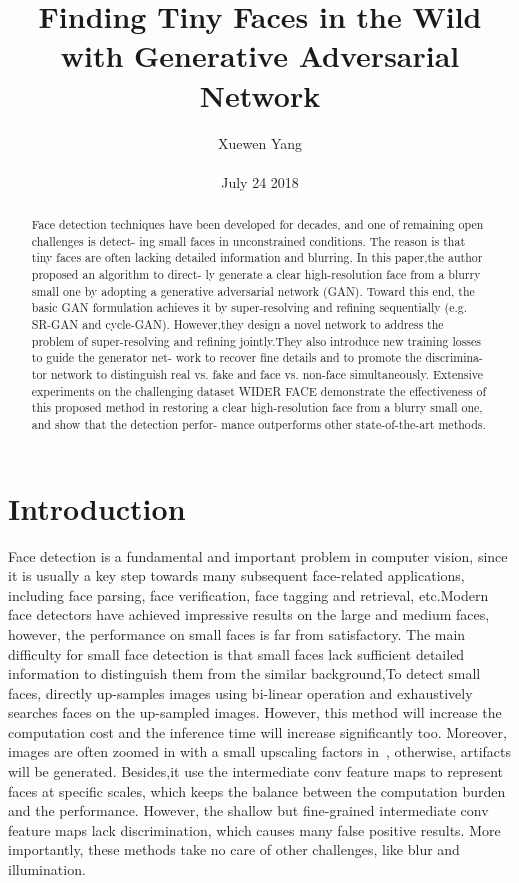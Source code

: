 \documentclass[10pt,twocolumn,letterpaper]{article}
\author{Xuewen Yang\\\\
July 24 2018}
\title{Finding Tiny Faces in the Wild with Generative Adversarial Network}
\begin{document}
\maketitle
\begin{abstract}
Face detection techniques have been developed for
decades, and one of remaining open challenges is detect-
ing small faces in unconstrained conditions. The reason is
that tiny faces are often lacking detailed information and
blurring. In this paper,the author proposed an algorithm to direct-
ly generate a clear high-resolution face from a blurry small
one by adopting a generative adversarial network (GAN).
Toward this end, the basic GAN formulation achieves it by
super-resolving and refining sequentially (e.g. SR-GAN and
cycle-GAN). However,they design a novel network to address
the problem of super-resolving and refining jointly.They also
introduce new training losses to guide the generator net-
work to recover fine details and to promote the discrimina-
tor network to distinguish real vs. fake and face vs. non-face
simultaneously. Extensive experiments on the challenging
dataset WIDER FACE demonstrate the effectiveness of this
proposed method in restoring a clear high-resolution face
from a blurry small one, and show that the detection perfor-
mance outperforms other state-of-the-art methods.
\end{abstract}
\section{Introduction}
Face detection is a fundamental and important problem
in computer vision, since it is usually a key step towards
many subsequent face-related applications, including
face parsing, face verification, face tagging and retrieval,
etc.Modern face detectors have achieved impressive results
on the large and medium faces, however, the performance
on small faces is far from satisfactory. The main difficulty
for small face detection is that small
faces lack sufficient detailed information to distinguish
them from the similar background,To detect small faces, \cite{Xu2017Learning} directly
up-samples images using bi-linear operation and exhaustively
searches faces on the up-sampled images. However,
this method will increase the computation cost and the
inference time will increase significantly too. Moreover,
images are often zoomed in with a small upscaling factors in~\cite{Xu2017Learning}, otherwise, artifacts will be generated.
Besides,it use the intermediate conv feature
maps to represent faces at specific scales, which keeps
the balance between the computation burden and the performance.
However, the shallow but fine-grained intermediate
conv feature maps lack discrimination, which causes many
false positive results. More importantly, these methods take
no care of other challenges, like blur and illumination.
\end{document}
